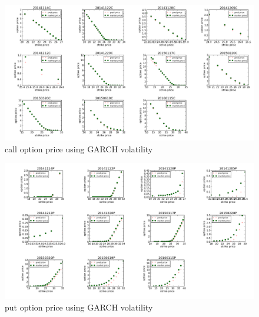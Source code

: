 \begin{landscape}
\begin{figure}[H]
\centering
\includegraphics[width=\linewidth]{GARCHVolaCall.png}
\caption{call option price using GARCH volatility}
\end{figure}
\begin{figure}[H]
\centering
\includegraphics[width=\linewidth]{GARCHVolaPut.png}
\caption{put option price using GARCH volatility}
\end{figure}


\end{landscape}
